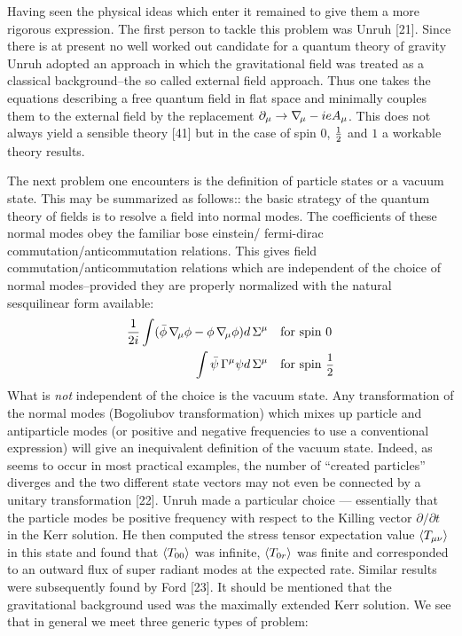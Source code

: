 Having seen the physical ideas which enter it remained to give them a
more rigorous expression. The first person to tackle this problem was
Unruh [21]. Since there is at present no well worked out candidate for a quantum theory
of gravity Unruh adopted an approach in which the gravitational field was treated as
a classical background--the so called external field approach. Thus one takes
the equations describing a free quantum field in flat space and minimally
couples them to the external field by the replacement $\partial_\mu \to \grad_\mu - ieA_\mu$.
This does not always yield a sensible theory [41] but in the case of spin 0, $\small{\frac{1}{2}}$ and $1$ a workable
theory results.

The next problem one encounters is the definition of particle states or a
vacuum state. This may be summarized as follows:: the basic strategy of the quantum theory of fields 
is to resolve a field into normal modes. The coefficients
of these normal modes obey the familiar bose einstein/ fermi-dirac commutation/anticommutation
relations. This gives field commutation/anticommutation relations which are independent
of the choice of normal modes--provided they are properly normalized with the
natural sesquilinear form available:
\begin{align}
\frac{1}{2i} \int (\bar\phi\grad_\mu\phi - \phi\grad_\mu\phi) d\,\Sigma^\mu \quad & \text{for spin 0}\\
\int \bar\psi\GG^\mu\psi d\,\Sigma^\mu \quad & \text{for spin \small$\half$}
\end{align}
What is {\it not} independent of the choice is the vacuum state. Any transformation
of the normal modes (Bogoliubov transformation) which mixes up particle and
antiparticle modes (or positive and negative frequencies to use a conventional expression)
will give an inequivalent definition of the vacuum state. Indeed, as
seems to occur in most practical examples, the number of ``created particles'' diverges and
the two different state vectors may not even be connected by a unitary transformation [22].
Unruh made a particular choice --- essentially that the particle modes be positive
frequency with respect to the Killing vector $\partial/\partial t$ in the Kerr solution.
He then computed the stress tensor expectation value $\langle T_{\mu\nu} \rangle$ in this state and found
that $\langle T_{00} \rangle$ was infinite, $\langle T_{0r} \rangle$ was finite and corresponded to an outward flux of
super radiant modes at the expected rate. Similar results were subsequently found by Ford [23].
It should be mentioned that the gravitational background used was the maximally
extended Kerr solution. We see that in general we meet three generic types of problem:
